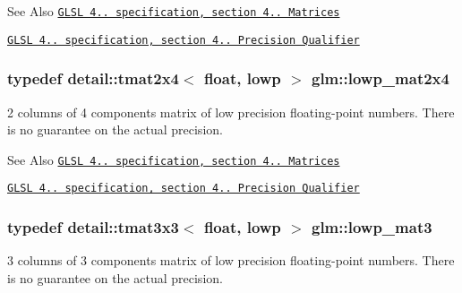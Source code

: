 \begin{DoxySeeAlso}{See Also}
\href{http://www.opengl.org/registry/doc/GLSLangSpec.4.20.8.pdf}{\tt G\-L\-S\-L 4.. specification, section 4.. Matrices} 

\href{http://www.opengl.org/registry/doc/GLSLangSpec.4.20.8.pdf}{\tt G\-L\-S\-L 4.. specification, section 4.. Precision Qualifier} 
\end{DoxySeeAlso}
\hypertarget{group__core__precision_gaa62e33ee2864909c8522a549fbf40ce5}{
\subsubsection[{lowp\-\_\-mat2x4}]{\setlength{\rightskip}{0pt plus 5cm}typedef detail\-::tmat2x4$<$ float, lowp $>$ {\bf glm\-::lowp\-\_\-mat2x4}}}\label{group__core__precision_gaa62e33ee2864909c8522a549fbf40ce5}
2 columns of 4 components matrix of low precision floating-\/point numbers. There is no guarantee on the actual precision.

\begin{DoxySeeAlso}{See Also}
\href{http://www.opengl.org/registry/doc/GLSLangSpec.4.20.8.pdf}{\tt G\-L\-S\-L 4.. specification, section 4.. Matrices} 

\href{http://www.opengl.org/registry/doc/GLSLangSpec.4.20.8.pdf}{\tt G\-L\-S\-L 4.. specification, section 4.. Precision Qualifier} 
\end{DoxySeeAlso}
\hypertarget{group__core__precision_gaae2935658c6a3668ac1935a7f6064d51}{
\subsubsection[{lowp\-\_\-mat3}]{\setlength{\rightskip}{0pt plus 5cm}typedef detail\-::tmat3x3$<$ float, lowp $>$ {\bf glm\-::lowp\-\_\-mat3}}}\label{group__core__precision_gaae2935658c6a3668ac1935a7f6064d51}
3 columns of 3 components matrix of low precision floating-\/point numbers. There is no guarantee on the actual precision.

